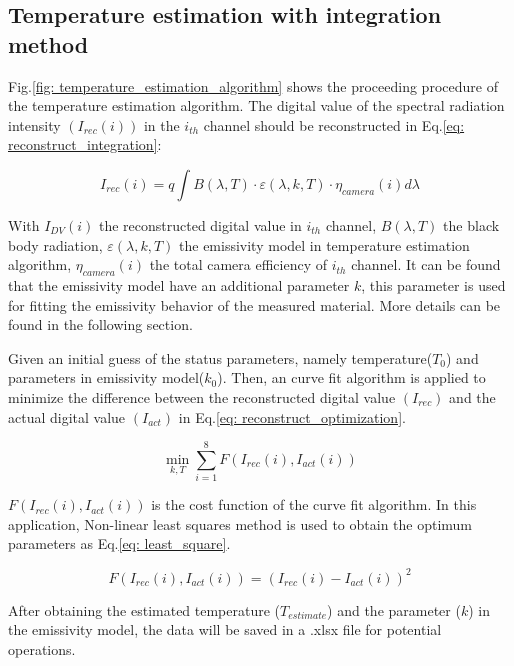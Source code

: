 \subsection{Temperature estimation with integration method}
Fig.\ref{fig: temperature_estimation_algorithm} shows the proceeding procedure of the 
temperature estimation algorithm. The digital value of the spectral radiation intensity
$(I_{rec}(i))$ 
in the $i_{th}$ channel should be reconstructed in Eq.\ref{eq: reconstruct_integration}:

\begin{equation}
    \label{eq: reconstruct_integration}
    I_{rec}(i) = q \int B(\lambda, T) \cdot \varepsilon(\lambda, k, T) \cdot \eta_{camera}(i) d\lambda
\end{equation}

With $I_{DV}(i)$ the reconstructed digital value in $i_{th}$ channel, $B(\lambda, T)$ the black body radiation, 
$\varepsilon(\lambda, k, T)$ the emissivity model in temperature estimation algorithm, 
$\eta_{camera}(i)$ the total camera efficiency of $i_{th}$ channel. It can be found that 
the emissivity model have an additional parameter $k$, this parameter is used for fitting 
the emissivity behavior of the measured material. More details can be found in the following 
section.


Given an initial guess of the status parameters, namely 
temperature($T_0$) and parameters in emissivity model($k_0$). Then, an curve fit 
algorithm is applied to minimize the difference between the reconstructed digital value $(I_{rec})$ 
and the actual digital value $(I_{act})$ in Eq.\ref{eq: reconstruct_optimization}.

\begin{equation}
    \label{eq: reconstruct_optimization}
    \min_{k, T}\sum_{i=1}^{8}  F(I_{rec}(i), I_{act}(i))
\end{equation} 

$F(I_{rec}(i), I_{act}(i))$ is the cost function of the curve fit algorithm. In this 
application, Non-linear least squares method is used to obtain the optimum parameters 
as Eq.\ref{eq: least_square}.

\begin{equation}
    \label{eq: least_square}
    F(I_{rec}(i), I_{act}(i)) = (I_{rec}(i) - I_{act}(i))^2
\end{equation}


After obtaining the estimated temperature ($T_{estimate}$) and the parameter ($k$) 
in the emissivity model, the data will be saved in a .xlsx file for 
potential operations.

